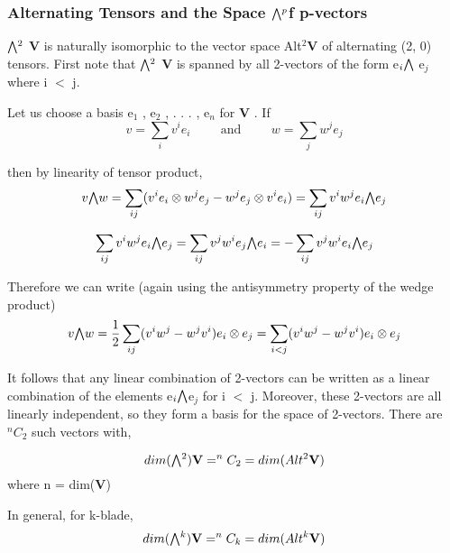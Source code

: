 \subsubsection{Alternating Tensors and the Space \texorpdfstring{$\exterior^p$} of p-vectors}
$\exterior^2$ \textbf{V} is naturally isomorphic to the vector space Alt$^2 \textbf{V}$ of alternating (2, 0) tensors. 
First note that $\exterior^2$ \textbf{V} is spanned by all 2-vectors of the form
e$_i\exterior$ e$_j$ where i $<$ j.

Let us choose a basis {e$_1$ , e$_2$ , . . . , e$_n$ } for \textbf{V} . If
\begin{equation}
    v = \sum_{i}v^ie_i \hspace{1cm} \text{and} \hspace{1cm} w = \sum_{j}w^je_j
\end{equation}

then by linearity of tensor product,
\begin{equation}
    v \exterior w = \sum_{ij} (v^ie_i \otimes w^je_j - w^je_j \otimes v^ie_i) = \sum_{ij}v^iw^j e_i \exterior e_j
\end{equation}

\begin{equation}
    \sum_{ij}v^iw^j e_i \exterior e_j = \sum_{ij}v^jw^i e_j \exterior e_i = - \sum_{ij}v^jw^i e_i \exterior e_j
\end{equation}

Therefore we can write (again using the antisymmetry property of the wedge
product)
\begin{equation}
    v \exterior w = \frac{1}{2} \sum_{ij} (v^iw^j - w^jv^i) e_i \otimes e_j = \sum_{i<j} (v^iw^j - w^jv^i) e_i \otimes e_j
\end{equation}

It follows that any linear combination of 2-vectors can be written as a linear combination
of the elements e$_i \exterior $e$_j$ for i $<$ j. Moreover, these 2-vectors are all linearly
independent, so they form a basis for the space of 2-vectors. There are $^nC_2$ such vectors with,

\begin{equation}
    dim(\exterior ^2)\textbf{V} = ^nC_2 =  dim(Alt^2 \textbf{V})
\end{equation}
where n = dim(\textbf{V})

In general, for k-blade,  
\begin{equation}
    dim(\exterior ^k)\textbf{V} = ^nC_k =  dim(Alt^k \textbf{V})
\end{equation}

